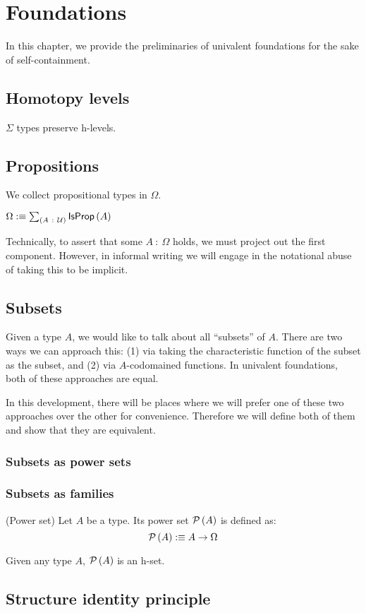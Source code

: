\chapter{Foundations}\label{chap:foundations}

In this chapter, we provide the preliminaries of univalent foundations for the sake of
self-containment.

\section{Homotopy levels}

\begin{prop}\label{isOfHLevelSigma}
  $\Sigma$ types preserve h-levels.
\end{prop}

\section{Propositions}

We collect propositional types in $\Omega$.

\begin{defn}\label{omega}
  $\Omega :\equiv \sum_{(A~:~\mathcal{U})} \mathsf{IsProp}\left(A\right)$
\end{defn}

Technically, to assert that some $A~:~\Omega$ holds, we must project out the first component.
However, in informal writing we will engage in the notational abuse of taking this to be
implicit.

\section{Subsets}

Given a type $A$, we would like to talk about all ``subsets'' of $A$. There are
two ways we can approach this: (1) via taking the characteristic function of the
subset as the subset, and (2) via $A$-codomained functions. In univalent
foundations, both of these approaches are equal.

In this development, there will be places where we will prefer one of these two
approaches over the other for convenience. Therefore we will define both of them
and show that they are equivalent.

\subsection{Subsets as power sets}

\subsection{Subsets as families}

\begin{defn}(Power set)
  Let $A$ be a type. Its power set $\mathcal{P}\left(A\right)$ is defined as:
  \begin{equation*}
    \mathcal{P}\left(A\right) :\equiv A \rightarrow \Omega
  \end{equation*}
\end{defn}

\begin{prop}\label{isSetPow}
  Given any type $A$, $\mathcal{P}\left(A\right)$ is an h-set.
\end{prop}

\section{Structure identity principle}
